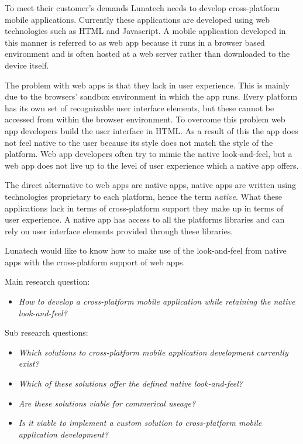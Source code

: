 

To meet their customer's demands Lunatech needs to develop cross-platform mobile applications. Currently these applications are developed using web technologies such as HTML and Javascript. A mobile application developed in this manner is referred to as web app because it runs in a browser based environment and is often hosted at a web server rather than downloaded to the device itself.

The problem with web apps is that they lack in user experience. This is mainly due to the browsers' sandbox environment in which the app runs. Every platform has its own set of recognizable user interface elements, but these cannot be accessed from within the browser environment. To overcome this problem web app developers build the user interface in HTML.  As a result of this the app does not feel native to the user because its style does not match the style of the platform. Web app developers often try to mimic the native look-and-feel, but a web app does not live up to the level of user experience which a native app offers.

The direct alternative to web apps are native apps, native apps are written using technologies proprietary to each platform, hence the term \emph{native}. What these applications lack in terms of cross-platform support they make up in terms of user experience.  A native app has access to all the platforms libraries and can rely on user interface elements provided through these libraries.

Lunatech would like to know how to make use of the look-and-feel from native apps with the cross-platform support of web apps.


Main research question:
\begin{itemize}
\item \emph{How to develop a cross-platform mobile application while retaining the native look-and-feel?}
\end{itemize}

\noindent Sub research questions:
\begin{itemize}
\item \emph{Which solutions to cross-platform mobile application development currently exist?}
\item \emph{Which of these solutions offer the defined native look-and-feel?}
\item \emph{Are these solutions viable for commerical useage?}
\item \emph{Is it viable to implement a custom solution to cross-platform mobile application development?}
\end{itemize}

